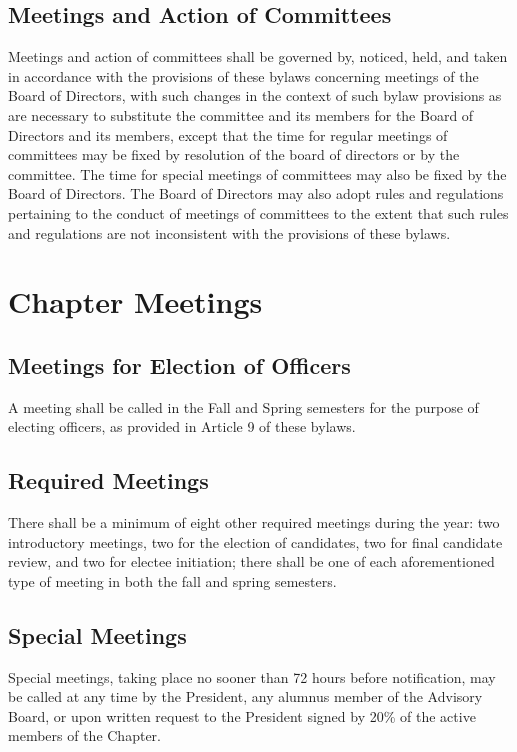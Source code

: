 \documentclass{article}
\begin{document}
	\subsection{Meetings and Action of Committees}
	Meetings and action of committees shall be governed by, noticed, held, and taken in accordance with the provisions of these bylaws concerning meetings of the Board of Directors, with such changes in the context of such bylaw provisions as are necessary to substitute the committee and its members for the Board of Directors and its members, except that the time for regular meetings of committees may be fixed by resolution of the board of directors or by the committee. The time for special meetings of committees may also be fixed by the Board of Directors. The Board of Directors may also adopt rules and regulations pertaining to the conduct of meetings of committees to the extent that such rules and regulations are not inconsistent with the provisions of these bylaws.
	
	\section{Chapter Meetings}
	\subsection{Meetings for Election of Officers}
	A meeting shall be called in the Fall and Spring semesters for the purpose of electing officers, as provided in Article 9 of these bylaws.
	
	\subsection{Required Meetings}
	There shall be a minimum of eight other required meetings during the year: two introductory meetings, two for the election of candidates, two for final candidate review, and two for electee initiation; there shall be one of each aforementioned type of meeting in both the fall and spring semesters.
	
	\subsection{Special Meetings}
	Special meetings, taking place no sooner than 72 hours before notification, may be called at any time by the President, any alumnus member of the Advisory Board, or upon written request to the President signed by 20\% of the active members of the Chapter.
	
\end{document}
